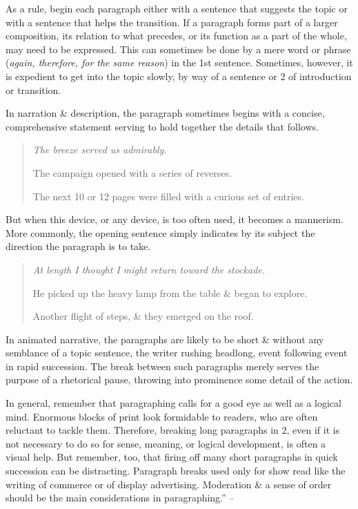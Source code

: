\documentclass{article}
\begin{document}
As a rule, begin each paragraph either with a sentence that suggests the topic or with a sentence that helps the transition. If a paragraph forms part of a larger composition, its relation to what precedes, or its function as a part of the whole, may need to be expressed. This can sometimes be done by a mere word or phrase ({\it again, therefore, for the same reason}) in the 1st sentence. Sometimes, however, it is expedient to get into the topic slowly, by way of a sentence or 2 of introduction or transition.

In narration \& description, the paragraph sometimes begins with a concise, comprehensive statement serving to hold together the details that follows.
\begin{quotation}\it
	The breeze served us admirably.
	
	The campaign opened with a series of reverses.
	
	The next 10 or 12 pages were filled with a curious set of entries.
\end{quotation}
But when this device, or any device, is too often used, it becomes a mannerism. More commonly, the opening sentence simply indicates by its subject the direction the paragraph is to take.
\begin{quotation}\it
	At length I thought I might return toward the stockade.
	
	He picked up the heavy lamp from the table \& began to explore.
	
	Another flight of steps, \& they emerged on the roof.
\end{quotation}
In animated narrative, the paragraphs are likely to be short \& without any semblance of a topic sentence, the writer rushing headlong, event following event in rapid succession. The break between such paragraphs merely serves the purpose of a rhetorical pause, throwing into prominence some detail of the action.

In general, remember that paragraphing calls for a good eye as well as a logical mind. Enormous blocks of print look formidable to readers, who are often reluctant to tackle them. Therefore, breaking long paragraphs in 2, even if it is not necessary to do so for sense, meaning, or logical development, is often a visual help. But remember, too, that firing off many short paragraphs in quick succession can be distracting. Paragraph breaks used only for show read like the writing of commerce or of display advertising. Moderation \& a sense of order should be the main considerations in paragraphing.'' -- \cite[pp. 30--31]{Strunk_White_element_style}
\end{document}
